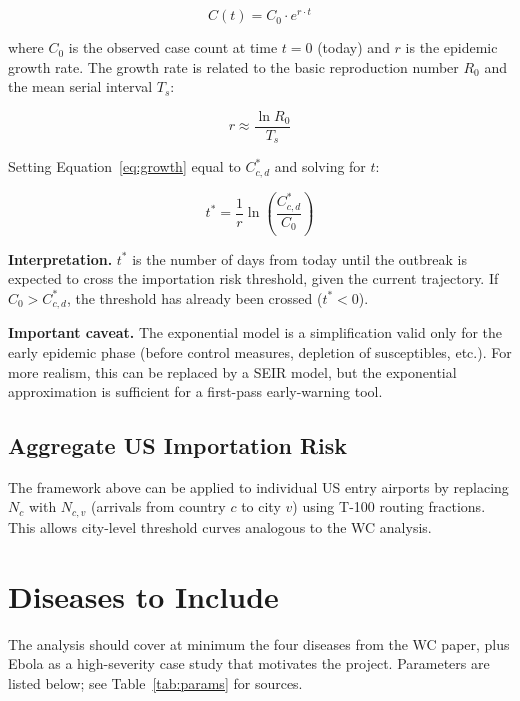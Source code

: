 \documentclass[12pt]{article}
\begin{document}
\begin{equation}
  C(t) = C_0 \cdot e^{r \cdot t}
  \label{eq:growth}
\end{equation}

where $C_0$ is the observed case count at time $t = 0$ (today) and
$r$ is the epidemic growth rate. The growth rate is related to the
basic reproduction number $R_0$ and the mean serial interval $T_s$:

\begin{equation}
  r \approx \frac{\ln R_0}{T_s}
  \label{eq:growth_rate}
\end{equation}

Setting Equation~\ref{eq:growth} equal to $C_{c,d}^*$ and solving
for $t$:

\begin{equation}
  \boxed{
    t^* = \frac{1}{r} \ln\!\left(\frac{C_{c,d}^*}{C_0}\right)
  }
  \label{eq:time_to_threshold}
\end{equation}

\textbf{Interpretation.} $t^*$ is the number of days from today
until the outbreak is expected to cross the importation risk
threshold, given the current trajectory. If $C_0 > C_{c,d}^*$,
the threshold has already been crossed ($t^* < 0$).

\textbf{Important caveat.} The exponential model is a simplification
valid only for the early epidemic phase (before control measures,
depletion of susceptibles, etc.). For more realism, this can be
replaced by a SEIR model, but the exponential approximation is
sufficient for a first-pass early-warning tool.

\subsection{Aggregate US Importation Risk}

The framework above can be applied to individual US entry airports
by replacing $N_c$ with $N_{c,v}$ (arrivals from country $c$ to
city $v$) using T-100 routing fractions. This allows city-level
threshold curves analogous to the WC analysis.

\section{Diseases to Include}

The analysis should cover at minimum the four diseases from the
WC paper, plus Ebola as a high-severity case study that motivates
the project. Parameters are listed below; see
Table~\ref{tab:params} for sources.
\end{document}
